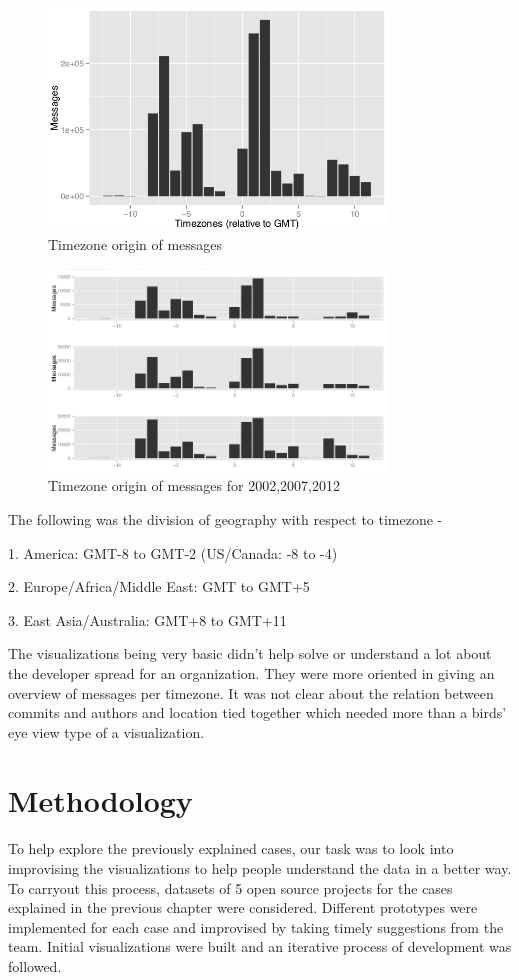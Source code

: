 \documentclass[seploa]{beavtex}
\begin{document}
\begin{figure}[!ht]
\centering
\includegraphics[width=90mm]{work1.png}
\caption{Timezone origin of messages}
\end{figure}

\begin{figure}[!ht]
\centering
\includegraphics[width=90mm]{work2.png}
\caption{Timezone origin of messages for 2002,2007,2012}
\end{figure}

The following was the division of geography with respect to timezone -

1. America: GMT-8 to GMT-2 (US/Canada: -8 to -4)

2. Europe/Africa/Middle East: GMT to GMT+5

3. East Asia/Australia: GMT+8 to GMT+11


The visualizations being very basic didn't help solve or understand a lot about the developer spread for an organization. They were more oriented in giving an overview of messages per timezone. It was not clear about the relation between commits and authors and location tied together which needed more than a birds' eye view type of a visualization. 


\chapter{Methodology}
To help explore the previously explained cases, our task was to look into improvising the visualizations to help people understand the data in a better way. To carryout this process, datasets of 5 open source projects for the cases explained in the previous chapter were considered. Different prototypes were implemented for each case and improvised by taking timely suggestions from the team. Initial visualizations were built and an iterative process of development was followed.
\end{document}
